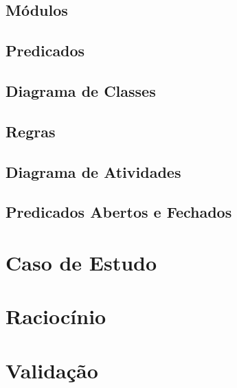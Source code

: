 \documentclass[openright]{normas-utf-tex} %
\begin{document}
	

		\subsection{Módulos} \label{mods}			
			
		
		\subsection{Predicados}\label{predic}
			
			
		\subsection{Diagrama de Classes}
			


		\subsection{Regras} \label{regras}
			

		\subsection{Diagrama de Atividades} \label{umldiagram}
			

		\subsection{Predicados Abertos e Fechados} \label{cenarios}
			


	\section{Caso de Estudo} \label{studycase}
		

	\section{Raciocínio} \label{rac}
		
	
	\section{Validação} \label{validation}
		
\end{document}
